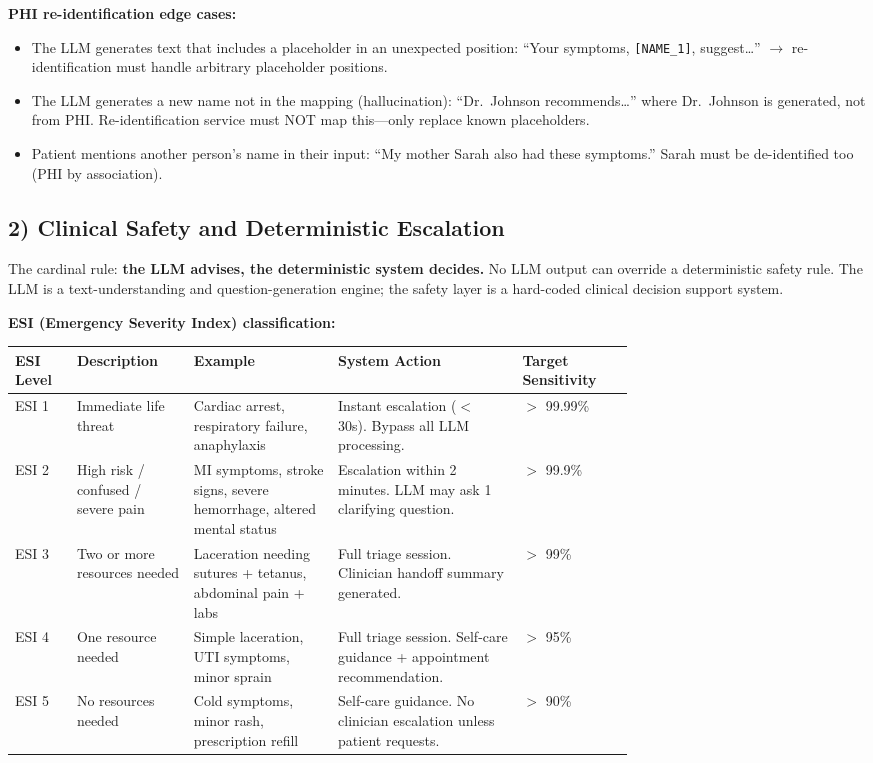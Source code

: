 \textbf{PHI re-identification edge cases:}
\begin{itemize}
  \item The LLM generates text that includes a placeholder in an unexpected position: ``Your symptoms, \texttt{[NAME\_1]}, suggest\ldots'' $\rightarrow$ re-identification must handle arbitrary placeholder positions.
  \item The LLM generates a new name not in the mapping (hallucination): ``Dr.\ Johnson recommends\ldots'' where Dr.\ Johnson is generated, not from PHI. Re-identification service must NOT map this---only replace known placeholders.
  \item Patient mentions another person's name in their input: ``My mother Sarah also had these symptoms.'' Sarah must be de-identified too (PHI by association).
\end{itemize}

\subsection*{2) Clinical Safety and Deterministic Escalation}

The cardinal rule: \textbf{the LLM advises, the deterministic system decides.} No LLM output can override a deterministic safety rule. The LLM is a text-understanding and question-generation engine; the safety layer is a hard-coded clinical decision support system.

\textbf{ESI (Emergency Severity Index) classification:}

{\small
\begin{tabular}{|p{0.06\linewidth}|p{0.12\linewidth}|p{0.18\linewidth}|p{0.23\linewidth}|p{0.13\linewidth}|}
\hline
\textbf{ESI Level} & \textbf{Description} & \textbf{Example} & \textbf{System Action} & \textbf{Target Sensitivity} \\
\hline
ESI 1 & Immediate life threat & Cardiac arrest, respiratory failure, anaphylaxis & Instant escalation ($<$ 30s). Bypass all LLM processing. & $>$ 99.99\% \\
\hline
ESI 2 & High risk / confused / severe pain & MI symptoms, stroke signs, severe hemorrhage, altered mental status & Escalation within 2 minutes. LLM may ask 1 clarifying question. & $>$ 99.9\% \\
\hline
ESI 3 & Two or more resources needed & Laceration needing sutures + tetanus, abdominal pain + labs & Full triage session. Clinician handoff summary generated. & $>$ 99\% \\
\hline
ESI 4 & One resource needed & Simple laceration, UTI symptoms, minor sprain & Full triage session. Self-care guidance + appointment recommendation. & $>$ 95\% \\
\hline
ESI 5 & No resources needed & Cold symptoms, minor rash, prescription refill & Self-care guidance. No clinician escalation unless patient requests. & $>$ 90\% \\
\hline
\end{tabular}
}

